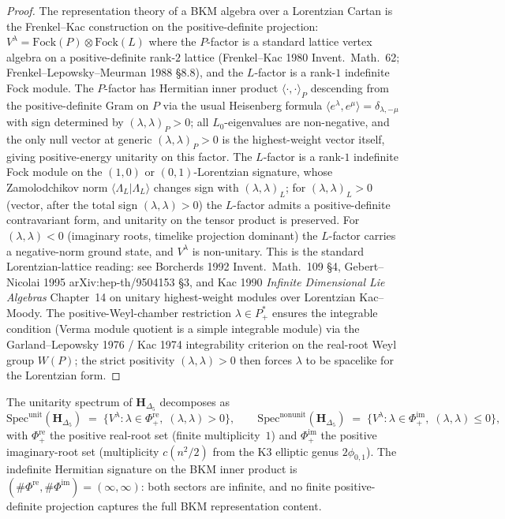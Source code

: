 \begin{proof}
The representation theory of a BKM algebra over a Lorentzian
Cartan is the Frenkel--Kac construction on the positive-definite
projection: $V^\lambda = \mathrm{Fock}(P)\otimes\mathrm{Fock}(L)$
where the $P$-factor is a standard lattice vertex algebra on a
positive-definite rank-$2$ lattice (Frenkel--Kac 1980
Invent.\ Math.\ 62; Frenkel--Lepowsky--Meurman 1988
\S 8.8), and the $L$-factor is a rank-$1$ indefinite Fock
module. The $P$-factor has Hermitian inner product
$\langle\cdot,\cdot\rangle_P$ descending from the positive-definite
Gram on $P$ via the usual Heisenberg formula
$\langle e^\lambda, e^\mu\rangle = \delta_{\lambda,-\mu}$
with sign determined by $(\lambda, \lambda)_P > 0$; all
$L_0$-eigenvalues are non-negative, and the only null vector at
generic $(\lambda, \lambda)_P > 0$ is the highest-weight
vector itself, giving positive-energy unitarity on this factor.
The $L$-factor is a rank-$1$ indefinite Fock module on the
$(1,0)$ or $(0,1)$-Lorentzian signature, whose Zamolodchikov
norm $\langle\Lambda_L|\Lambda_L\rangle$ changes sign with
$(\lambda, \lambda)_L$; for $(\lambda, \lambda)_L > 0$ (vector,
after the total sign $(\lambda, \lambda) > 0$) the $L$-factor
admits a positive-definite contravariant form, and unitarity on
the tensor product is preserved. For $(\lambda, \lambda) < 0$
(imaginary roots, timelike projection dominant) the $L$-factor
carries a negative-norm ground state, and $V^\lambda$ is
non-unitary. This is the standard Lorentzian-lattice reading:
see Borcherds 1992 Invent.\ Math.\ 109 \S 4, Gebert--Nicolai
1995 arXiv:hep-th/9504153 \S 3, and Kac 1990 \emph{Infinite
Dimensional Lie Algebras} Chapter~14 on unitary highest-weight
modules over Lorentzian Kac--Moody. The positive-Weyl-chamber
restriction $\lambda \in P^*_+$ ensures the integrable condition
(Verma module quotient is a simple integrable module) via the
Garland--Lepowsky 1976 / Kac 1974 integrability criterion on
the real-root Weyl group $W(P)$; the strict positivity
$(\lambda, \lambda) > 0$ then forces $\lambda$ to be spacelike
for the Lorentzian form.
\end{proof}

\begin{corollary}
\label{cor:stqp-real-imag-dichotomy}
The unitarity spectrum of $\mathbf H_{\Delta_5}$ decomposes as
\[
\mathrm{Spec}^{\mathrm{unit}}(\mathbf H_{\Delta_5})
\;=\;
\{V^\lambda : \lambda \in \Phi^{\mathrm{re}}_+,\;
(\lambda, \lambda) > 0\},
\qquad
\mathrm{Spec}^{\mathrm{nonunit}}(\mathbf H_{\Delta_5})
\;=\;
\{V^\lambda : \lambda \in \Phi^{\mathrm{im}}_+,\;
(\lambda, \lambda) \le 0\},
\]
with $\Phi^{\mathrm{re}}_+$ the positive real-root set (finite
multiplicity~$1$) and $\Phi^{\mathrm{im}}_+$ the positive
imaginary-root set (multiplicity $c(n^2/2)$ from the K3 elliptic
genus $2\phi_{0,1}$). The indefinite Hermitian signature on the
BKM inner product is $(\#\Phi^{\mathrm{re}}, \#\Phi^{\mathrm{im}})
= (\infty, \infty)$: both sectors are infinite, and no finite
positive-definite projection captures the full BKM representation
content.
\end{corollary}

